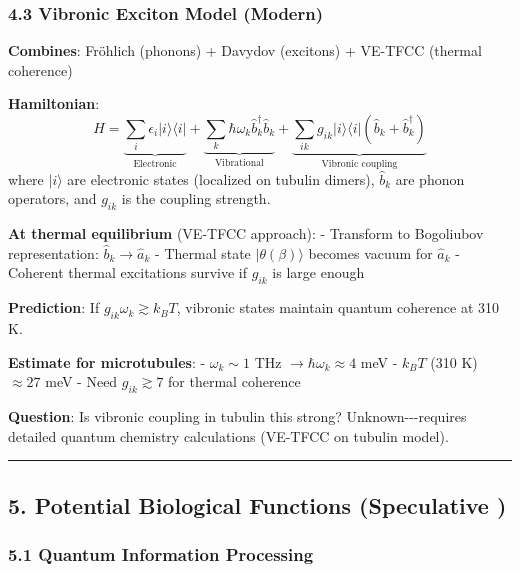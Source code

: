 \subsubsection{4.3 Vibronic Exciton Model
(Modern)}\label{vibronic-exciton-model-modern}

\textbf{Combines}: Fröhlich (phonons) + Davydov (excitons) + VE-TFCC
(thermal coherence)

\textbf{Hamiltonian}:
\[\hat{H} = \underbrace{\sum_i \epsilon_i | i \rangle \langle i |}_{\text{Electronic}} + \underbrace{\sum_k \hbar \omega_k \hat{b}_k^\dagger \hat{b}_k}_{\text{Vibrational}} + \underbrace{\sum_{ik} g_{ik} | i \rangle \langle i | (\hat{b}_k + \hat{b}_k^\dagger)}_{\text{Vibronic coupling}}\]
where \(| i \rangle\) are electronic states (localized on tubulin
dimers), \(\hat{b}_k\) are phonon operators, and \(g_{ik}\) is the
coupling strength.

\textbf{At thermal equilibrium} (VE-TFCC approach): - Transform to
Bogoliubov representation: \(\hat{b}_k \rightarrow \hat{a}_k\) - Thermal
state \(|\theta(\beta)\rangle\) becomes vacuum for \(\hat{a}_k\) -
Coherent thermal excitations survive if \(g_{ik}\) is large enough

\textbf{Prediction}: If \(g_{ik} \omega_k \gtrsim k_B T\), vibronic
states maintain quantum coherence at 310 K.

\textbf{Estimate for microtubules}: - \(\omega_k \sim 1\) THz
\(\rightarrow \hbar \omega_k \approx 4\) meV - \(k_B T\) (310 K)
\(\approx 27\) meV - Need \(g_{ik} \gtrsim 7\) for thermal coherence

\textbf{Question}: Is vibronic coupling in tubulin this strong?
Unknown-\/-\/-requires detailed quantum chemistry calculations (VE-TFCC
on tubulin model).

\begin{center}\rule{0.5\linewidth}{0.5pt}\end{center}

\subsection{5. Potential Biological Functions (Speculative
)}\label{potential-biological-functions-speculative}

\subsubsection{5.1 Quantum Information
Processing}\label{quantum-information-processing}

